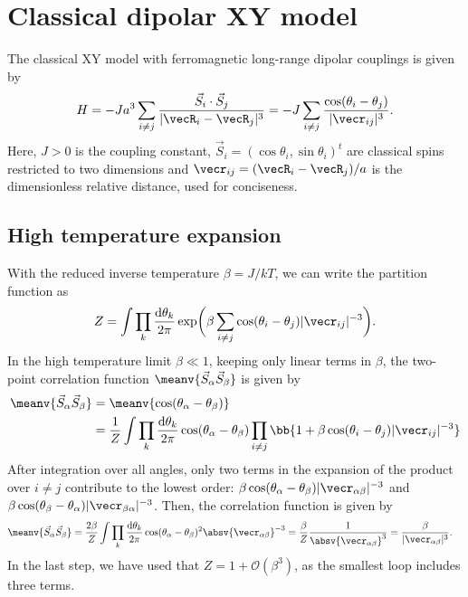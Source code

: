 \chapter{Classical dipolar XY model}
\label{xy_model}

The classical XY model with ferromagnetic long-range dipolar couplings is given by
\begin{align}
    H = -J a^3 \sum_{i\ne j} \frac{\vec{S}_i \cdot \vec{S}_j}{|\vecR_i - \vecR_j|^3}
  = -J \sum_{i\ne j} \frac{\cos(\theta_i - \theta_j)}{|\vecr_{ij}|^3}.
\end{align}
Here, $J>0$ is the coupling constant, $\vec{S}_i=(\cos \theta_i, \sin \theta_i)^t$ are classical spins restricted to two dimensions and $\vecr_{ij}=(\vecR_i - \vecR_j)/a$ is the dimensionless relative distance, used for conciseness.

\section{High temperature expansion}
With the reduced inverse temperature $\beta = J/kT$, we can write the partition function as
\begin{align}
    Z=\int\prod_{k} \frac{\mathrm{d}\theta_k}{2\pi}  \operatorname{exp}\!\bigg(\beta \sum_{i\ne j} \cos(\theta_i - \theta_j) |\vecr_{ij}|^{-3} \bigg).
\end{align}
In the high temperature limit $\beta \ll 1$, keeping only linear terms in $\beta$,
the two-point correlation function $\meanv{\vec{S}_\alpha \vec{S}_\beta}$ is given by
\begin{align}
    \meanv{\vec{S}_\alpha \vec{S}_\beta} &= \meanv{\cos(\theta_\alpha - \theta_\beta)} \\ &= \frac{1}{Z} \int\prod_{k} \frac{\mathrm{d}\theta_k}{2\pi}  \cos(\theta_\alpha - \theta_\beta)
    \prod_{i\ne j}  \bb{1 + \beta \cos(\theta_i - \theta_j) |\vecr_{ij}|^{-3}}
\end{align}
After integration over all angles, only two terms in the expansion of the product over $i\ne j$ contribute to the lowest order: $\beta \cos(\theta_\alpha - \theta_\beta) |\vecr_{\alpha\beta}|^{-3}$ and $\beta \cos(\theta_\beta - \theta_\alpha) |\vecr_{\beta\alpha}|^{-3}$. Then, the correlation function is given by
\begin{align}
    \meanv{\vec{S}_\alpha \vec{S}_\beta} &= \frac{2 \beta}{Z} \int\prod_{k} \frac{\mathrm{d}\theta_k}{2\pi} \cos(\theta_\alpha - \theta_\beta)^2 \absv{\vecr_{\alpha\beta}}^{-3}
    = \frac{\beta}{Z} \frac{1}{\absv{\vecr_{\alpha\beta}}^3} = \frac{\beta}{|\vecr_{\alpha\beta}|^3}.
\end{align}
In the last step, we have used that $Z = 1+ \mathcal{O}(\beta^3)$, as the smallest loop includes three terms.
